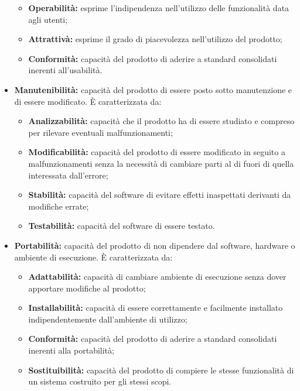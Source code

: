 \begin{itemize}
\begin{itemize}
		\item \textbf{Operabilità:} esprime l'indipendenza nell'utilizzo delle funzionalità data agli utenti;
		\item \textbf{Attrattivà:} esprime il grado di piacevolezza nell'utilizzo del prodotto;
		\item \textbf{Conformità:} capacità del prodotto di aderire a standard consolidati inerenti all'usabilità.
	\end{itemize}
	\item \textbf{Manutenibilità:} capacità del prodotto di essere posto sotto manutenzione e di essere modificato. È caratterizzata da:
	\begin{itemize}
		\item \textbf{Analizzabilità:} capacità che il prodotto ha di essere studiato e compreso per rilevare eventuali malfunzionamenti;
		\item \textbf{Modificabilità:} capacità del prodotto di essere modificato in seguito a malfunzionamenti senza la necessità di cambiare parti al di fuori di quella interessata dall'errore;
		\item \textbf{Stabilità:} capacità del software di evitare effetti inaspettati derivanti da modifiche errate;
		\item \textbf{Testabilità:} capacità del software di essere testato.
	\end{itemize}
	\item \textbf{Portabilità:} capacità del prodotto di non dipendere dal software, hardware o ambiente di esecuzione. È caratterizzata da:
	\begin{itemize}
		\item \textbf{Adattabilità:} capacità di cambiare ambiente di esecuzione senza dover apportare modifiche al prodotto;
		\item \textbf{Installabilità:} capacità di essere correttamente e facilmente installato indipendentemente dall'ambiente di utilizzo;
		\item \textbf{Conformità:} capacità del prodotto di aderire a standard consolidati inerenti alla portabilità;
		\item \textbf{Sostituibilità:} capacità del prodotto di compiere le stesse funzionalità di un sistema costruito per gli stessi scopi.
	\end{itemize}
\end{itemize}

